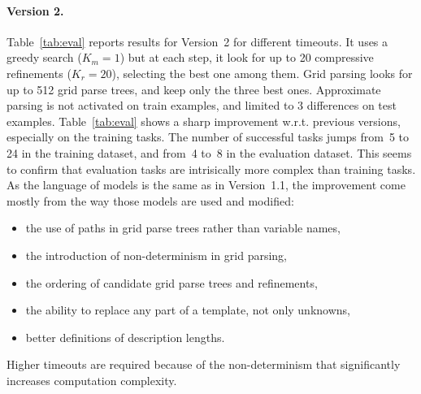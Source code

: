 \documentclass[a4paper]{llncs}
\begin{document}
\paragraph{Version 2.} Table~\ref{tab:eval} reports results for
Version~2 for different timeouts. It uses a greedy search ($K_m = 1$)
but at each step, it look for up to 20 compressive refinements
($K_r = 20$), selecting the best one among them. Grid parsing looks
for up to 512 grid parse trees, and keep only the three best
ones. Approximate parsing is not activated on train examples, and
limited to 3 differences on test examples.
%
Table~\ref{tab:eval} shows a sharp improvement w.r.t. previous
versions, especially on the training tasks. The number of successful
tasks jumps from~5 to 24 in the training dataset, and from~4 to~8 in
the evaluation dataset. This seems to confirm that evaluation tasks
are intrisically more complex than training tasks.
%
As the language of models is the same as in Version~1.1, the
improvement come mostly from the way those models are used and
modified:
\begin{itemize}
\item the use of paths in grid parse trees rather than variable names,
\item the introduction of non-determinism in grid parsing,
\item the ordering of candidate grid parse trees and refinements,
\item the ability to replace any part of a template, not only unknowns,
\item better definitions of description lengths.
\end{itemize}
Higher timeouts are required because of the non-determinism that
significantly increases computation complexity.
\end{document}
